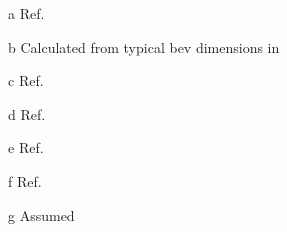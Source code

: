 \begin{table}[!htbp]
\begin{threeparttable}[t]
\begin{tabular*}{0.675\textwidth}{@{} l @{\extracolsep{\fill}}  S @{}}
			\bottomrule
		\end{tabular*}
        \begin{tablenotes}
        \item[a]Ref.~\cite{HybridCars2017Drag}
        \item[b]Calculated from typical \gls{bev} dimensions in~\cite{BoltDimensions}
        \item[c]Ref.~\cite{ETANTP002-2004}
        \item[d]Ref.~\cite{BoltOverview}
        \item[e]Ref.~\cite{Liu2016a}
        \item[f]Ref.~\cite{EmadiElectric}
        \item[g]Assumed
        \end{tablenotes}
	\end{threeparttable}
\end{table}
